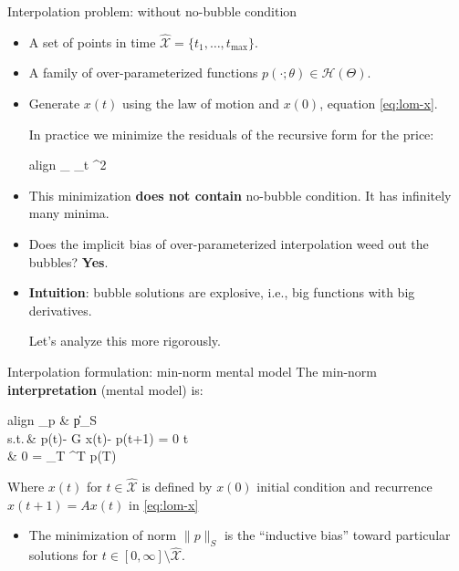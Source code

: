 \documentclass[aspectratio=169,10pt]{beamer}
\newcommand{\emphcolor}[1]{\textbf{\textcolor{emphcolorval}{#1}}}
\newcommand{\Xtrain}{\hat{\mathcal{X}}}
\newcommand{\st}{\textrm{s.t.}\,}
\begin{document}
\begin{frame}{Interpolation problem: without no-bubble condition}
	\begin{itemize}
		\item A set of points in time $\Xtrain = \{t_1,\ldots,t_{\text{max}}\}$.
		\item A family of over-parameterized functions $p(\cdot;\theta) \in \mathcal{H}(\Theta)$.
		\item Generate $x(t)$ using the law of motion and $x(0)$, equation \cref{eq:lom-x}.
		
		In practice we minimize the residuals of the recursive form for the price:
		\begin{empheq}[box=\tcbhighmath]{align}
			\min_{\theta \in \Theta} \frac{1}{|\Xtrain|}\sum_{t \in \Xtrain} ^2
		\end{empheq}
		\item This minimization \emphcolor{does not contain}  no-bubble condition. It has infinitely many minima.
		\item Does the implicit bias of over-parameterized interpolation weed out the bubbles? \emphcolor{Yes}.
		\item  \emphcolor{Intuition}: bubble solutions are explosive, i.e., big functions with big derivatives.
		\bigskip
		
		Let's analyze this more rigorously. 
	\end{itemize}
\end{frame}

\begin{frame}{Interpolation formulation: min-norm mental model}
	The min-norm \emphcolor{interpretation} (mental model) is:
	\begin{empheq}[box=\tcbhighmath]{align}
		\min_{p \in {}} \quad & \|p\|_S\\
		\st \quad & p(t)- G x(t)- \beta p(t+1) = 0 \quad {} t  \in \Xtrain \label{eq:p-t-deep} \\
		\quad & 0 = \lim_{T \rightarrow \infty} \beta^T p(T) \label{eq:no-bubble-condition-deep}
	\end{empheq}
	Where $x(t)$ for $t  \in \Xtrain$ is defined by $x(0)$ initial condition and recurrence $x(t+1) = A x(t)$ in \cref{eq:lom-x}
	\begin{itemize}
		\item The minimization of norm $\|p\|_S$ is the ``inductive bias'' toward particular solutions for $t \in [0,\infty] \setminus \Xtrain$.\medskip
	\end{itemize}
\end{frame}
\end{document}
